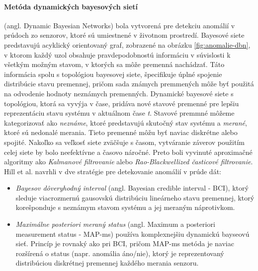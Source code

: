 \paragraph{Metóda dynamických bayesových sietí} (angl. Dynamic Bayesian Networks) \citep{hill2007real} bola vytvorená pre detekciu anomálií v prúdoch zo senzorov, ktoré sú umiestnené v životnom prostredí. Bayesové siete predstavujú acyklický orientovaný graf, zobrazené na obrázku \ref{fig:anomalie-dbn}, v ktorom každý uzol obsahuje pravdepodobnostú informáciu v súvislosti k všetkým možným stavom, v ktorých sa môže premenná nachádzať. Táto informácia spolu s topológiou bayesovej siete, špecifikuje úplné spojenie distribúcie stavu premennej, pričom sada známych premmených môže byť použitá na odvodenie hodnoty neznámych premenných. Dynamické bayesové siete s topológiou, ktorá sa vyvýja v čase, pridáva nové stavové premenné pre lepšiu reprezentáciu stavu systému v aktuálnom čase \textit{t}. Stavové premmné môžeme kategorizovať ako \textit{neznáme}, ktoré predstavujú skutočný stav systému a \textit{merané}, ktoré sú nedonalé merania. Tieto premenné môžu byť naviac diskrétne alebo spojité. Nakoľko sa veľkosť siete zväčšuje s časom, vytváranie záverov použitím celej siete by bolo neefektívne a časovo náročné. Preto boli vyvinuté aproximačné algoritmy ako \textit{Kalmanové filtrovanie} alebo \textit{Rao-Blackwellized časticové filtrovanie}.\\
Hill et al. navrhli v \citep{hill2007real} dve stratégie pre detekovanie anomálií v prúde dát:
\begin{itemize}
	\item \textit{Bayesov dôveryhodný interval} (angl. Bayesian credible interval - BCI), ktorý sleduje viacrozmernú gausovskú distribúciu lineárneho stavu premennej, ktorý korešponduje s neznámym stavom systému a jej meraným náprotivkom.
	\item \textit{Maximálne posteriori meraný status} (angl. Maximum a posteriori measurement status - MAP-ms) používa komplexnejšiu dynamickú bayseovú sieť. Princíp je rovnaký ako pri BCI, pričom MAP-ms metóda je naviac rozšírená o status (napr. anomália áno/nie), ktorý je reprezentovaný distribúciou diskrétnej premennej každého merania senzoru.
\end{itemize}
\label{fig:anomalie-dbn}


